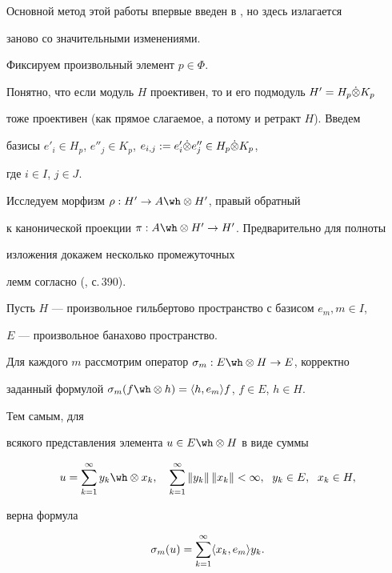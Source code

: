 Основной метод этой работы впервые введен в \cite {Chel1}, но здесь излагается


заново со значительными изменениями.





Фиксируем произвольный элемент $p \in \Phi$.


Понятно, что если модуль $H$ проективен, то и его подмодуль $H'=H_p \Dot \otimes K_p$


тоже проективен (как прямое слагаемое, а потому и ретракт $H$). Введем


базисы $e'_i \in H_p$, $e''_j


\in K_p$, $e_{i,j}:=e'_i \tenp e''_j \in H_p \tenp K_p$,


где $i \in I$, $j \in J$.





Исследуем морфизм $\rho :H' \to A \tens H'$, правый обратный


к канонической проекции $\pi :A \tens H' \to H'$. Предварительно для полноты


изложения докажем несколько промежуточных 


лемм согласно (\cite{Chel1}, с.\,390).





Пусть $H$ --- произвольное гильбертово пространство с базисом $e_m,m \in I$,


$E$ --- произвольное банахово пространство.


Для каждого $m$ рассмотрим оператор $\si_m: E \tens H \to E$, корректно


заданный формулой $\si_m(f \tens h)=\lan h,e_m \ran f$, $f \in E$, $h \in H$.


Тем самым, для


всякого представления элемента $u \in E \tens H$ в виде суммы


$$


u=\sumki y_k \tens x_k,\quad \sumki \| y_k\|\, \| x_k\| <\infty,


\ \; y_k\in E,\ \; x_k\in H,


$$


верна формула


\begin{equation} \label {eq5}


\si_m (u)= \sumki \lan x_k,e_m \ran y_k.


\end{equation}





